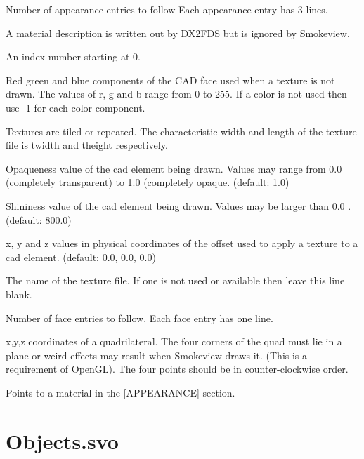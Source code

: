 \documentclass[11pt,twoside]{book}
\newcommand{\parma}{.75}
\newcommand{\parmb}{.5}
\newcommand{\parmc}{0.25}
\newcommand{\blist}{
\begin{list}
{}{
\setlength{\leftmargin}{\parma in}
\setlength{\labelwidth}{\parmb in}
\setlength{\labelsep}{\parmc in}
\setlength{\listparindent}{0.3in}
\setlength{\topsep}{.3in}
\setlength{\parsep}{.0in}
}}
\newcommand{\elist}{\end{list}}
\newcommand{\hitem}[1]{\item[{\bf #1} \hfill]}
\begin{document}
\blist

\hitem{nappearances} Number of appearance entries to follow
Each appearance entry has 3 lines.
\hitem{string} A material description is written out by DX2FDS but is ignored by Smokeview.
\hitem{index} An index number starting at 0.
\hitem{r, g, b} Red green and blue components of the CAD face used when a texture is not drawn.
The values of r, g and b range from 0 to 255.  If a color is not used then use -1 for each color component.
\hitem{twidth, theight} Textures are tiled or repeated.  The characteristic width and length of the
texture file is twidth and theight respectively.
\hitem{alpha}Opaqueness value of the cad element being drawn.  Values may range from 0.0 (completely transparent)
to 1.0 (completely opaque.  (default: 1.0)
\hitem{shininess} Shininess value of the cad element being drawn.  Values may be larger than 0.0 .  (default: 800.0)
\hitem{tx0, ty0, tz0} x, y and z values in physical coordinates of the offset used to apply a
texture to a cad element. (default: 0.0, 0.0, 0.0)
\hitem{tfile} The name of the texture file.  If one is not used or available then leave this line blank.
\hitem{nfaces} Number of face entries to follow.  Each face entry has one line.
\hitem{x1/y1/z1/.../x4/y4/z4}x,y,z coordinates of a quadrilateral.  The four corners of the quad
must lie in a plane or weird effects may result when Smokeview draws it.  (This is a requirement
of OpenGL).  The four points should be in counter-clockwise order.
\hitem{index} Points to a material in the [APPEARANCE] section.
\elist

\section{Objects.svo}
\label{section:objects}

\end{document}
